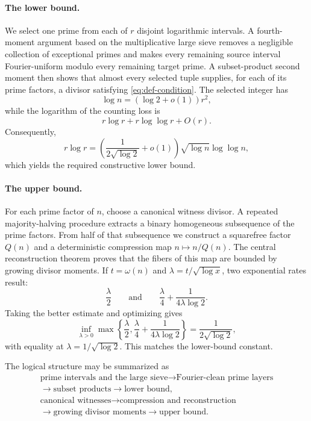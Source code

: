 \documentclass[11pt]{amsart}
\theoremstyle{definition}
\theoremstyle{remark}
\numberwithin{equation}{section}
\begin{document}
\paragraph{The lower bound.}
We select one prime from each of $r$ disjoint logarithmic intervals.  A
fourth-moment argument based on the multiplicative large sieve removes a
negligible collection of exceptional primes and makes every remaining
source interval Fourier-uniform modulo every remaining target prime.  A
subset-product second moment then shows that almost every selected tuple
supplies, for each of its prime factors, a divisor satisfying
\eqref{eq:def-condition}.  The selected integer has
\[
 \log n=(\log 2+o(1))r^2,
\]
while the logarithm of the counting loss is
\[
 r\log r+r\log\log r+O(r).
\]
Consequently,
\[
 r\log r
 =\left(\frac1{2\sqrt{\log 2}}+o(1)\right)
 \sqrt{\log n}\log\log n,
\]
which yields the required constructive lower bound.

\paragraph{The upper bound.}
For each prime factor of $n$, choose a canonical witness divisor.  A repeated
majority-halving procedure extracts a binary homogeneous subsequence of the
prime factors.  From half of that subsequence we construct a squarefree
factor $Q(n)$ and a deterministic compression map $n\mapsto n/Q(n)$.  The
central reconstruction theorem proves that the fibers of this map are
bounded by growing divisor moments.  If $t=\omega(n)$ and
$\lambda=t/\sqrt{\log x}$, two exponential rates result:
\[
 \frac{\lambda}{2}
 \qquad\text{and}\qquad
 \frac{\lambda}{4}+\frac1{4\lambda\log 2}.
\]
Taking the better estimate and optimizing gives
\begin{equation}\label{eq:intro-optimization}
 \inf_{\lambda>0}\max\left\{
 \frac{\lambda}{2},
 \frac{\lambda}{4}+\frac1{4\lambda\log 2}
 \right\}
 =\frac1{2\sqrt{\log 2}},
\end{equation}
with equality at $\lambda=1/\sqrt{\log 2}$.  This matches the lower-bound
constant.

The logical structure may be summarized as
\[
\begin{gathered}
 \text{prime intervals and the large sieve}
 \longrightarrow \text{Fourier-clean prime layers}\\
 \longrightarrow \text{subset products}
 \longrightarrow \text{lower bound},\\[1mm]
 \text{canonical witnesses}
 \longrightarrow \text{compression and reconstruction}\\
 \longrightarrow \text{growing divisor moments}
 \longrightarrow \text{upper bound}.
\end{gathered}
\]
\end{document}
